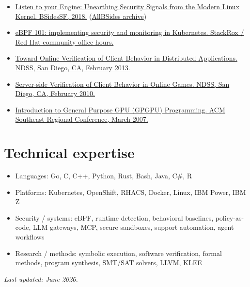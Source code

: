 \documentclass[10pt,letterpaper]{article}
\begin{document}
\begin{itemize}

  \item \href{https://www.youtube.com/watch?v=LFqWl7XB5Gc}{Listen to your Engine: Unearthing Security Signals from the Modern Linux Kernel. BSidesSF, 2018.} (\href{https://allbsides.com/talk/LFqWl7XB5Gc.html}{AllBSides archive})

  \item \href{https://speakerdeck.com/redhatlivestreaming/stackrox-community-office-hours-e2-ebpf-101-implementing-security-and-monitoring-kubernetes}{eBPF 101: implementing security and monitoring in Kubernetes. StackRox / Red Hat community office hours.}

  \item \href{https://www.ndss-symposium.org/ndss-2013-programme/toward-online-verification-client-behavior-distributed-applications/}{Toward Online Verification of Client Behavior in Distributed Applications. NDSS, San Diego, CA, February 2013.}

  \item \href{https://www.ndss-symposium.org/wp-content/uploads/2017/09/beth.pdf}{Server-side Verification of Client Behavior in Online Games. NDSS, San Diego, CA, February 2010.}

  \item \href{https://www.robbycochran.com/pdf/ACMSE07.pdf}{Introduction to General Purpose GPU (GPGPU) Programming. ACM Southeast Regional Conference, March 2007.}

\end{itemize}

\section*{Technical expertise}

\begin{itemize}

  \item Languages: Go, C, C++, Python, Rust, Bash, Java, C\#, R

  \item Platforms: Kubernetes, OpenShift, RHACS, Docker, Linux, IBM Power, IBM Z

  \item Security / systems: eBPF, runtime detection, behavioral baselines, policy-as-code, LLM gateways, MCP, secure sandboxes, support automation, agent workflows

  \item Research / methods: symbolic execution, software verification, formal methods, program synthesis, SMT/SAT solvers, LLVM, KLEE

\end{itemize}

\emph{Last updated: June 2026.}
\end{document}
